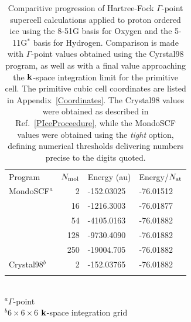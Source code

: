 \documentclass[prb,aps,nobibnotes,twocolumn,doublespace,twocolumngrid,superbib]{revtex4}
\begin{document}
%
%
%
\begin{table}[p]
\caption{
Comparitive progression of Hartree-Fock $\Gamma$-point supercell calculations 
applied to proton ordered ice using the 8-51G basis for Oxygen and the 5-11G$^*$ 
basis for Hydrogen.
Comparison is made with $\Gamma$-point values obtained using the {\sc Cyrstal98} program, 
as well as with a final value approaching the $\bf k$-space integration limit for the 
primitive cell.  The primitive cubic cell coordinates are listed in Appendix~\ref{Coordinates}.
The {\sc Crystal98} values were obtained as described in Ref.~\ref{PIceProceedure}, while 
the {\sc MondoSCF} values were obtained using the {\it tight} option, defining numerical 
thresholds delivering numbers precise to the digits quoted.} 
\label{PIceTable}
\begin{tabular}{lrll}
\toprule
Program         & $N_{\rm mol}$              & Energy (au)    & Energy/$N_{\rm at}$\\ 
\colrule
{\sc MondoSCF}$^a$  & 2    &  -152.03025  &  -76.01512  \\
                    & 16   &  -1216.3003  &  -76.01877  \\
                    & 54   &  -4105.0163  &  -76.01882  \\
                    & 128  &  -9730.4090  &  -76.01882  \\
                    & 250  &  -19004.705  &  -76.01882  \\ 
\hline
{\sc Crystal98}$^b$  & 2   &  -152.03765  &  -76.01882  \\ 
\botrule
\end{tabular}\\
$^a \Gamma$-point\\
$^b 6\times6\times6$ $\bf k$-space integration grid \\
\end{table}
\end{document}
